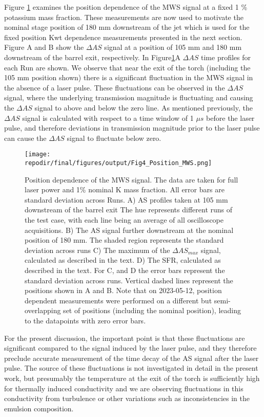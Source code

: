 Figure \ref{fig:pos_dependence_mws} examines the position dependence of the MWS signal at a fixed 1 \% potassium mass fraction.  These measurements are now used to motivate the nominal stage position of 180 mm downstream of the jet which is used for the fixed position Kwt dependence measurements presented in the next section. Figure A and B show the $\Delta AS$ signal at a position of 105 mm and 180 mm downstream of the barrel exit, respectively. In Figure\ref{fig:pos_dependence_mws}A $\Delta AS$ time profiles for each Run are shown. We observe that near the exit of the torch (including the 105 mm position shown) there is a significant fluctuation in the MWS signal in the absence of a laser pulse. These fluctuations can be observed in the $\Delta AS$ signal, where the underlying transmission magnitude is fluctuating and causing the $\Delta AS$ signal to above and below the zero line. As mentioned previously, the $\Delta AS$ signal is calculated with respect to a time window of 1 $\mu s$ before the laser pulse, and therefore deviations in transmission magnitude prior to the laser pulse can cause the $\Delta AS$ signal to fluctuate below zero.


\begin{figure}[h]
    \texttt{[image: \\repodir/final/figures/output/Fig4\_Position\_MWS.png]} 
    \centering
    \caption{Position dependence of the MWS signal. The data are taken for full laser power and 1\% nominal K mass fraction. All error bars are standard deviation across Runs.  A) AS profiles taken at 105 mm downstream of the barrel exit The hue represents different runs of the test case, with each line being an average of all oscilloscope acquisitions.  B) The AS signal further downstream at the nominal position of 180 mm. The shaded region represents the standard deviation across runs C)  The maximum of the $\Delta AS_{max}$ signal, calculated as described in the text.  D) The SFR, calculated as described in the text.  For C, and D the error bars represent the standard deviation across runs. Vertical dashed lines represent the positions shown in A and B. Note that on 2023-05-12, position dependent measurements were performed on a different but semi-overlapping set of positions (including the nominal position), leading to the datapoints with zero error bars. } 
    \label{fig:pos_dependence_mws}
\end{figure}

For the present discussion, the important point is that these fluctuations are significant compared to the signal induced by the laser pulse, and they therefore preclude accurate measurement of the time decay of the AS signal after the laser pulse. The source of these fluctuations is not investigated in detail in the present work, but presumably the temperature at the exit of the torch is sufficiently high for thermally induced conductivity and we are observing fluctuations in this conductivity from turbulence or other variations such as inconsistencies in the emulsion composition.

